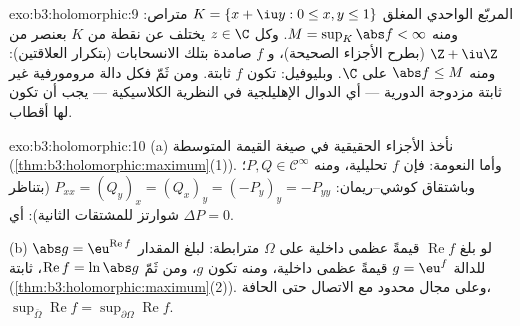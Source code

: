 \begin{solution}{exo:b3:holomorphic:9}
المربّع الواحدي المغلق $K = \{x + \iu y : 0 \leq x, y \leq
1\}$ متراص: ومنه $M = \sup_K\abs f < \infty$. وكل
$z \in \C$ يختلف عن نقطة من $K$ بعنصر من $\Z + \iu\Z$ (بطرح
الأجزاء الصحيحة)، و $f$ صامدة بتلك الانسحابات (بتكرار
العلاقتين): ومنه $\abs f \leq M$ على $\C$. وبليوفيل: تكون $f$
ثابتة. ومن ثَمّ فكل دالة مرومورفية غير ثابتة مزدوجة الدورية ---
أي الدوال الإهليلجية في النظرية الكلاسيكية --- يجب أن تكون لها
أقطاب.
\end{solution}

\begin{solution}{exo:b3:holomorphic:10}
(a) نأخذ الأجزاء الحقيقية في صيغة القيمة المتوسطة
(\cref{thm:b3:holomorphic:maximum}(1)). وأما النعومة: فإن $f$ تحليلية، ومنه $P, Q \in \mathcal C^\infty$؛
وباشتقاق كوشي--ريمان: $P_{xx} = (Q_y)_x = (Q_x)_y = (-P_y)_y =
-P_{yy}$ (بتناظر شوارتز للمشتقات الثانية):
أي $\Delta P =
0$.

(b) لو بلغ $\operatorname{Re}f$ قيمةً عظمى داخلية على $\Omega$ مترابطة: لبلغ
المقدار $\abs g =
\eu^{\operatorname{Re}f}$ للدالة $g = \eu^f$ قيمةً عظمى داخلية، ومنه تكون
$g$، ومن ثَمّ $\operatorname{Re}f = \ln\abs g$، ثابتة (\cref{thm:b3:holomorphic:maximum}(2)). وعلى مجال محدود مع
الاتصال حتى الحافة، $\sup_{\bar\Omega}\operatorname{Re}f =
\sup_{\partial\Omega}\operatorname{Re}f$.
\end{solution}


